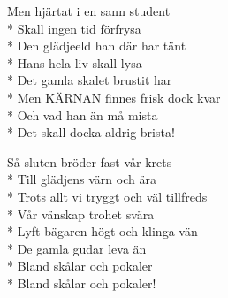 \begin{SongText}
\begin{longtable}{p{}p{}}
    \end{longtable}


    \begin{SongVerse}
        Men hjärtat i en sann student\\*
        Skall ingen tid förfrysa\\*
        Den glädjeeld han där har tänt\\*
        Hans hela liv skall lysa\\*
        Det gamla skalet brustit har\\*
        Men KÄRNAN finnes frisk dock kvar\\*
        Och vad han än må mista\\*
        Det skall docka aldrig brista!
    \end{SongVerse}
    \begin{SongVerse}
        Så sluten bröder fast vår krets\\*
        Till glädjens värn och ära\\*
        Trots allt vi tryggt och väl tillfreds\\*
        Vår vänskap trohet svära\\*
        Lyft bägaren högt och klinga vän\\*
        De gamla gudar leva än\\*
        Bland skålar och pokaler\\*
        Bland skålar och pokaler!
    \end{SongVerse}
\end{SongText}


%
%
%
%
%
%
%
\newpage